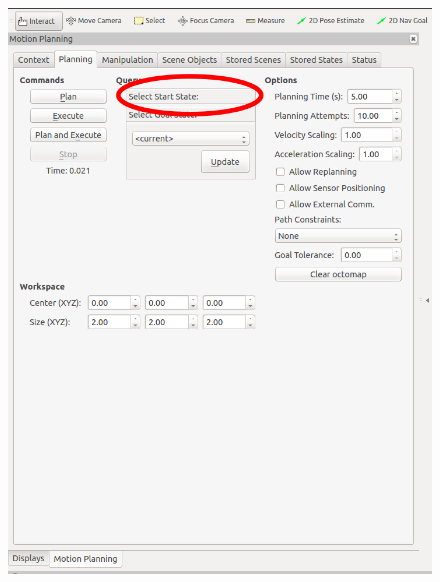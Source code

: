\begin{figure}
\includegraphics[scale=0.23]{images/motion_planning/gui_moving_procedure_3.png}

\end{figure}
